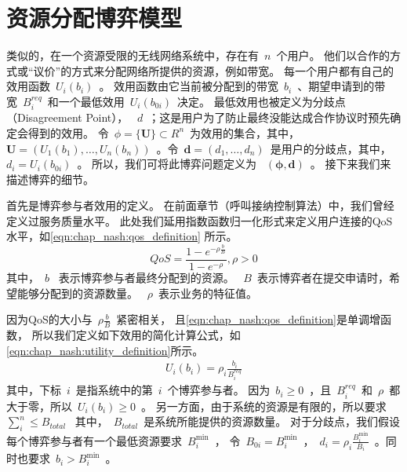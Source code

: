 \section{资源分配博弈模型}
类似的，在一个资源受限的无线网络系统中，存在有~$n$~个用户。
他们以合作的方式或“议价”的方式来分配网络所提供的资源，例如带宽。
每一个用户都有自己的效用函数~$U_i(b_i)$~。
效用函数由它当前被分配到的带宽~$b_i$~、期望申请到的带宽~$B_i^{req}$~和一个最低效用~$U_i(b_{0i})$~决定。
最低效用也被定义为分歧点（Disagreement Point）， ~$d$~；这是用户为了防止最终没能达成合作协议时预先确定会得到的效用。
令~$\phi = \{ \mathbf{U} \} \subset R^n$~为效用的集合，其中，~$\mathbf{U} =(U_1(b_1), \ldots, U_n(b_n))$~。令~$\mathbf{d} = (d_1, \ldots, d_n)$~是用户的分歧点，其中，~$d_i = U_i(b_{0i})$~。
所以，我们可将此博弈问题定义为 ~$(\mathbf{\phi,d})$~。
接下来我们来描述博弈的细节。

首先是博弈参与者效用的定义。
在前面章节（呼叫接纳控制算法）中，我们曾经定义过服务质量水平。
此处我们延用指数函数归一化形式来定义用户连接的QoS水平，如\eqref{eqn:chap_nash:qos_definition} 所示。
\begin{equation}
QoS = \frac{1- e^{-\rho \frac{b}{B} }}{1-e^{-\rho}}, \rho > 0
\label{eqn:chap_nash:qos_definition}
\end{equation}
其中，~$b$~ 表示博弈参与者最终分配到的资源。
~$B$~表示博弈者在提交申请时，希望能够分配到的资源数量。
~$\rho$~表示业务的特征值。

因为QoS的大小与~$\rho \frac{b}{B}$~紧密相关，
且\eqref{eqn:chap_nash:qos_definition}是单调增函数，
所以我们定义如下效用的简化计算公式，如 \eqref{eqn:chap_nash:utility_definition}所示。
\begin{align}
    U_i(b_i) = \rho_i \frac{b_i}{B_i^{req}}
    \label{eqn:chap_nash:utility_definition}
\end{align}
其中，下标~$i$~是指系统中的第~$i$~个博弈参与者。
因为~$b_i\ge 0$~，且~$B_i^{req}$~和~$\rho$~都大于零，所以~$U_i(b_i)\ge0$~。
另一方面，由于系统的资源是有限的，所以要求~$\sum_i^n \le B_{total}$~
其中，~$B_{total}$~是系统所能提供的资源数量。
对于分歧点，我们假设每个博弈参与者有一个最低资源要求~$B_i^{\min}$~，
令~$B_{0i} = B_i^{\min} $~，~$d_i = \rho_i \frac{B_i^{\min}}{B_i}$~。同时也要求~$b_i > B_i^{\min}$~。

